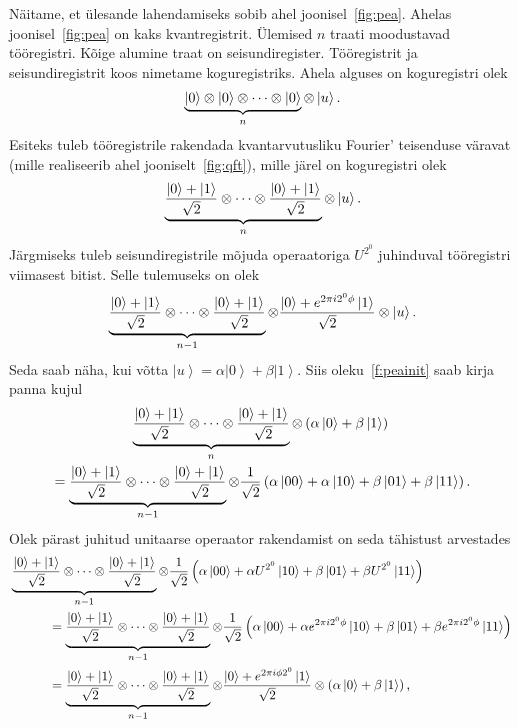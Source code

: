 \documentclass[12pt]{report}
\def\paren#1{\left(#1\right)}
\def\ket#1{\left|#1\right>}
\begin{document}
Näitame, et ülesande lahendamiseks sobib ahel joonisel~\ref{fig:pea}.
Ahelas joonisel~\ref{fig:pea} on kaks kvantregistrit.
Ülemised \(n\) traati moodustavad tööregistri.
Kõige alumine traat on seisundiregister.
Tööregistrit ja seisundiregistrit koos nimetame koguregistriks.
Ahela alguses on koguregistri olek
\begin{align}
    \underbrace{\ket{0} \otimes \ket{0} \otimes \cdots \otimes \ket{0}}_n \otimes \ket{u} \rlap{.}
\end{align}
Esiteks tuleb tööregistrile rakendada kvantarvutusliku Fourier' teisenduse väravat (mille realiseerib ahel jooniselt~\ref{fig:qft}), mille järel on koguregistri olek
\begin{align}\label{f:peainit}
    \underbrace{\frac{\ket{0}+\ket{1}}{\sqrt{2}}
    \otimes \cdots
    \otimes \frac{\ket{0}+\ket{1}}{\sqrt{2}}}_n
    \otimes \ket{u} \rlap{.}
\end{align}
Järgmiseks tuleb seisundiregistrile mõjuda operaatoriga \(U^{2^0}\) juhinduval tööregistri viimasest bitist.
Selle tulemuseks on olek
\begin{align}\label{f:peau0}
    \underbrace{\frac{\ket{0}+\ket{1}}{\sqrt{2}}
    \otimes \cdots
    \otimes \frac{\ket{0}+\ket{1}}{\sqrt{2}}}_{n - 1}
    \otimes \frac{\ket{0}+e^{2\pi i2^0\phi}\ket{1}}{\sqrt{2}}
    \otimes \ket{u} \rlap{.}
\end{align}
Seda saab näha, kui võtta \(\ket{u} = \alpha\ket{0} + \beta\ket{1}\).
Siis oleku~\eqref{f:peainit} saab kirja panna kujul
\begin{multline}
    \underbrace{\frac{\ket{0}+\ket{1}}{\sqrt{2}}
    \otimes \cdots
    \otimes \frac{\ket{0}+\ket{1}}{\sqrt{2}}}_n
    \otimes \paren{\alpha \ket{0} + \beta \ket{1}} \\
    = \underbrace{\frac{\ket{0}+\ket{1}}{\sqrt{2}}
    \otimes \cdots
    \otimes \frac{\ket{0}+\ket{1}}{\sqrt{2}}}_{n - 1}
    \otimes \frac{1}{\sqrt{2}} \paren{
        \alpha \ket{00} + \alpha \ket{10}
        + \beta \ket{01} + \beta \ket{11}
    } \rlap{.}
\end{multline}
Olek pärast juhitud unitaarse operaator rakendamist on seda tähistust arvestades
\begin{align}
    &\underbrace{\frac{\ket{0}+\ket{1}}{\sqrt{2}}
    \otimes \cdots
    \otimes \frac{\ket{0}+\ket{1}}{\sqrt{2}}}_{n - 1}
    \otimes \frac{1}{\sqrt{2}} \paren{
        \alpha \ket{00} + \alpha U^{2^0} \ket{10}
        + \beta \ket{01} + \beta U^{2^0} \ket{11}
    } \\
    &\phantom{AAAA}= \underbrace{\frac{\ket{0}+\ket{1}}{\sqrt{2}}
    \otimes \cdots
    \otimes \frac{\ket{0}+\ket{1}}{\sqrt{2}}}_{n - 1}
    \otimes \frac{1}{\sqrt{2}} \paren{
        \alpha \ket{00} + \alpha e^{2\pi i2^0\phi} \ket{10}
        + \beta \ket{01} + \beta e^{2\pi i2^0\phi} \ket{11}
    } \\
    &\phantom{AAAA}= \underbrace{\frac{\ket{0}+\ket{1}}{\sqrt{2}}
    \otimes \cdots
    \otimes \frac{\ket{0}+\ket{1}}{\sqrt{2}}}_{n - 1}
    \otimes \frac{\ket{0} + e^{2\pi i\phi 2^0} \ket{1}}{\sqrt{2}}
    \otimes \paren{\alpha \ket{0} + \beta \ket{1}} \rlap{,}
\end{align}
\end{document}
